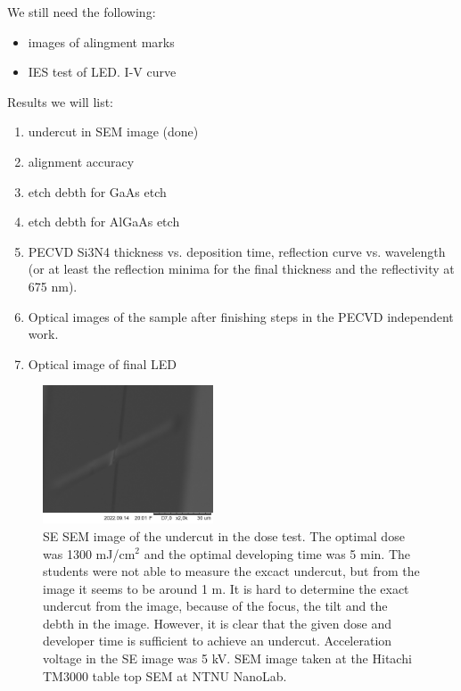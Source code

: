 

We still need the following:
\begin{itemize}
    \item images of alingment marks
    \item IES test of LED. I-V curve
\end{itemize}


Results we will list:

\begin{enumerate}
    \item undercut in SEM image (done)
    \item alignment accuracy
    \item etch debth for GaAs etch
    \item etch debth for AlGaAs etch
    \item PECVD Si3N4 thickness vs. deposition time, reflection curve vs. wavelength (or at least the reflection minima for the final thickness and the reflectivity at 675 nm).
    \item Optical images of the sample after finishing steps in the PECVD independent work.
    \item Optical image of final LED
\end{enumerate}


\begin{figure}[ht]
    \centering
    \includegraphics[width=0.45\textwidth]{figures/Undercut_5min_1200mJcm-2.jpg}
    \caption{
        SE SEM image of the undercut in the dose test.
        The optimal dose was 1300 mJ/cm$^2$ and the optimal developing time was 5 min.
        The students were not able to measure the excact undercut, but from the image it seems to be around 1 \textmu m.
        It is hard to determine the exact undercut from the image, because of the focus, the tilt and the debth in the image.
        However, it is clear that the given dose and developer time is sufficient to achieve an undercut.
        Acceleration voltage in the SE image was 5 kV.
        SEM image taken at the Hitachi TM3000 table top SEM at NTNU NanoLab.
    }
    \label{fig:undercut}
\end{figure}